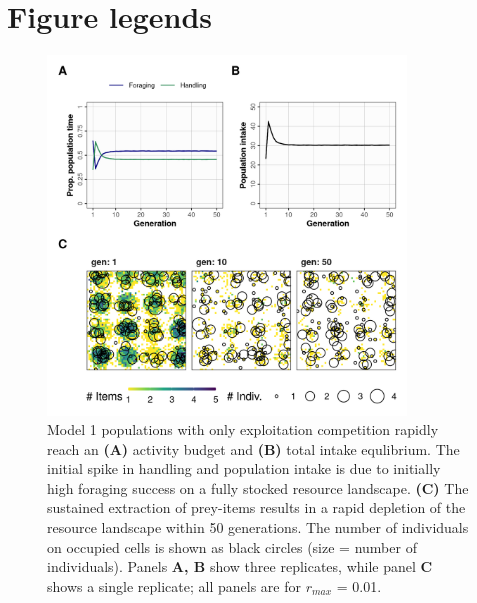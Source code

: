 \documentclass[11pt]{article}
\begin{document}
\newpage{}

\section{Figure legends}

\begin{figure}[h!]
    \centering
    \includegraphics[width=0.85\textwidth]{figures/fig_02.png}
    \caption{
        Model 1 populations with only exploitation competition rapidly reach an \textbf{(A)} activity budget and \textbf{(B)} total intake equlibrium. The initial spike in handling and population intake is due to initially high foraging success on a fully stocked resource landscape.
        \textbf{(C)} The sustained extraction of prey-items results in a rapid depletion of the resource landscape within 50 generations. The number of individuals on occupied cells is shown as black circles (size = number of individuals). Panels \textbf{A, B} show three replicates, while panel \textbf{C} shows a single replicate; all panels are for $r_{max}$ = 0.01.
    }
    \label{Fig:Model1}
\end{figure}
\end{document}

